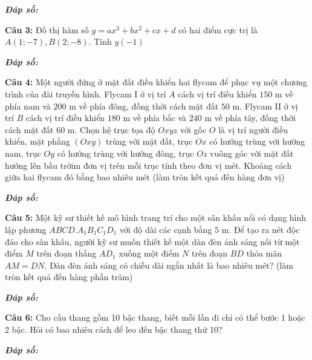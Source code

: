 \documentclass[12pt, a4paper]{article}
\begin{document}
	\textit{\textbf{Đáp số: }}
	\framebox[20mm]{\rule{0pt}{4mm}}
	
\textbf{Câu 3: } Đồ thị hàm số $ y = ax^3 + bx^2 + cx + d $ có hai điểm cực trị là $ A(1;-7), B(2;-8)$. Tính $y(-1)$

	\textit{\textbf{Đáp số: }}
	\framebox[20mm]{\rule{0pt}{4mm}}
	
\textbf{Câu 4: } Một người đứng ở mặt đất điều khiển hai flycam để phục vụ một chương trình của đài truyền hình. Flycam I ở vị trí $ A $ cách vị trí điều khiển $ 150 $ m về phía nam và $ 200 $ m về phía đông, đồng thời cách mặt đất $ 50 $ m. Flycam II ở vị trí $ B $ cách vị trí điều khiển $ 180 $ m về phía bắc và $ 240 $ m về phía tây, đồng thời cách mặt đất $ 60 $ m. Chọn hệ trục tọa độ $ Oxyz $ với gốc $ O $ là vị trí người điều khiển, mặt phẳng $ (Oxy) $ trùng với mặt đất, trục $ Ox $ có hướng trùng với hướng nam, trục $ Oy $ có hướng trùng với hướng đông, trục $ Oz $ vuông góc với mặt đất hướng lên bầu trờim đơn vị trên mỗi trục tính theo đơn vị mét. Khoảng cách giữa hai flycam đó bằng bao nhiêu mét (làm tròn kết quả đến hàng đơn vị)

	\textit{\textbf{Đáp số: }}
	\framebox[20mm]{\rule{0pt}{4mm}}

\textbf{Câu 5: } Một kỹ sư thiết kế mô hình trang trí cho một sân khấu nổi có dạng hình lập phương $ ABCD.A_1B_1C_1D_1 $ với độ dài các cạnh bằng $ 5 $ m. Để tạo ra nét độc đáo cho sân khấu, người kỹ sư muốn thiết kế một dàn đèn ánh sáng nối từ một điểm $ M $ trên đoạn thẳng $ AD_1 $ xuống một điểm $ N $ trên đoạn $ BD $ thỏa mãn $ AM = DN $. Dàn đèn ánh sáng có chiều dài ngắn nhất là bao nhiêu mét? (làm tròn kết quả đến hàng phần trăm) 

	\textit{\textbf{Đáp số: }}
	\framebox[20mm]{\rule{0pt}{4mm}}
	
\textbf{Câu 6: } Cho cầu thang gồm 10 bậc thang, biết mỗi lần đi chỉ có thể bước 1 hoặc 2 bậc. Hỏi có bao nhiêu cách để leo đến bậc thang thứ 10?

	\textit{\textbf{Đáp số: }}
	\framebox[20mm]{\rule{0pt}{4mm}}
	
\end{document}
